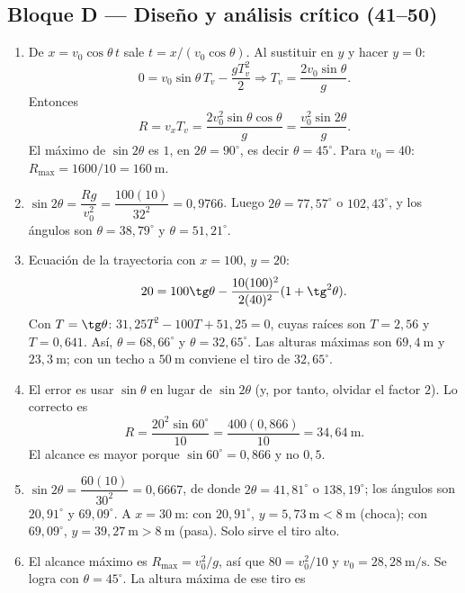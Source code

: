 \documentclass[12pt, letterpaper]{article}
\providecommand{\sen}{\sin}
\begin{document}
\subsection*{Bloque D — Diseño y análisis crítico (41--50)}
\begin{enumerate}[leftmargin=*, label=\textbf{\arabic*.}, start=41]
  \item De $x=v_0\cos\theta\,t$ sale $t=x/(v_0\cos\theta)$. Al sustituir en
        $y$ y hacer $y=0$:
        \[
          0=v_0\sen\theta\,T_v-\frac{gT_v^2}{2}
          \Rightarrow T_v=\frac{2v_0\sen\theta}{g}.
        \]
        Entonces
        \[
          R=v_xT_v
          =\frac{2v_0^2\sen\theta\cos\theta}{g}
          =\frac{v_0^2\sen2\theta}{g}.
        \]
        El máximo de $\sen2\theta$ es $1$, en $2\theta=90^\circ$, es decir
        $\theta=45^\circ$. Para $v_0=40$:
        $R_{\max}=1600/10=160\ \text{m}$.
  \item $\sen2\theta=\dfrac{Rg}{v_0^2}=\dfrac{100(10)}{32^2}=0{,}9766$.
        Luego $2\theta=77{,}57^\circ$ o $102{,}43^\circ$, y los ángulos son
        $\theta=38{,}79^\circ$ y $\theta=51{,}21^\circ$.
  \item Ecuación de la trayectoria con $x=100$, $y=20$:
        \[
          20=100\tg\theta-\frac{10(100)^2}{2(40)^2}(1+\tg^2\theta).
        \]
        Con $T=\tg\theta$:
        $31{,}25T^2-100T+51{,}25=0$, cuyas raíces son $T=2{,}56$ y
        $T=0{,}641$. Así, $\theta=68{,}66^\circ$ y $\theta=32{,}65^\circ$.
        Las alturas máximas son $69{,}4\ \text{m}$ y $23{,}3\ \text{m}$;
        con un techo a $50\ \text{m}$ conviene el tiro de $32{,}65^\circ$.
  \item El error es usar $\sen\theta$ en lugar de $\sen2\theta$ (y, por
        tanto, olvidar el factor $2$). Lo correcto es
        \[
          R=\frac{20^2\sen60^\circ}{10}
          =\frac{400(0{,}866)}{10}=34{,}64\ \text{m}.
        \]
        El alcance es mayor porque $\sen60^\circ=0{,}866$ y no $0{,}5$.
  \item $\sen2\theta=\dfrac{60(10)}{30^2}=0{,}6667$, de donde
        $2\theta=41{,}81^\circ$ o $138{,}19^\circ$; los ángulos son
        $20{,}91^\circ$ y $69{,}09^\circ$. A $x=30\ \text{m}$:
        con $20{,}91^\circ$, $y=5{,}73\ \text{m}<8\ \text{m}$ (choca);
        con $69{,}09^\circ$, $y=39{,}27\ \text{m}>8\ \text{m}$ (pasa).
        Solo sirve el tiro alto.
  \item El alcance máximo es $R_{\max}=v_0^2/g$, así que
        $80=v_0^2/10$ y $v_0=28{,}28\ \text{m/s}$. Se logra con
        $\theta=45^\circ$. La altura máxima de ese tiro es

\end{enumerate}
\end{document}
